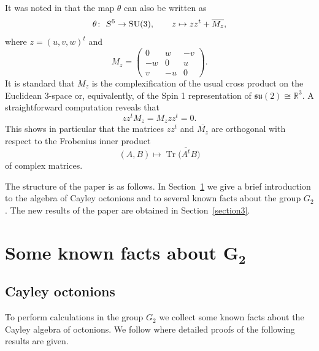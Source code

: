 \documentclass[10pt,a4paper]{amsart}
\numberwithin{equation}{section}
\begin{document}
It was noted in \cite[Section~2]{puttmann2003presentations} that the map $\theta$ can also be written as
\begin{gather*}
\theta\colon \ S^5 \rightarrow {\rm SU}(3), \qquad z\mapsto zz^t+\overline{M_z},
\end{gather*}
where $z=(u,v,w)^t$ and
\[M_z=
\begin{pmatrix}
0 & w &-v\\
-w & 0 & u \\
v & -u & 0
\end{pmatrix}.
\]
It is standard that $M_z$ is the complexification of the usual cross product on the Euclidean 3-space or, equivalently, of the Spin 1 representation of $\mathfrak{su}(2) \cong \mathbb{R}^3$. A straightforward computation reveals that
\[ zz^tM_z=M_zzz^t=0.\]
This shows in particular that the matrices $zz^t$ and $\overline{M_z}$ are orthogonal with respect to the Frobenius inner product
\[ (A,B) \mapsto \operatorname{Tr}\big(\overline{A^t}B\big) \]
of complex matrices.

The structure of the paper is as follows. In Section~\ref{section2} we give a brief introduction to the algebra of Cayley octonions and to several known facts about the group $G_2$. The new results of the paper are obtained in Section~\ref{section3}.

\section[Some known facts about $G_2$]{Some known facts about $\boldsymbol{G_2}$}\label{section2}

\subsection{Cayley octonions}\label{section2.1}

To perform calculations in the group $G_2$ we collect some known facts about the Cayley algebra of octonions. We follow \cite{postnikov1986lie} where detailed proofs of the following results are given.
\end{document}
